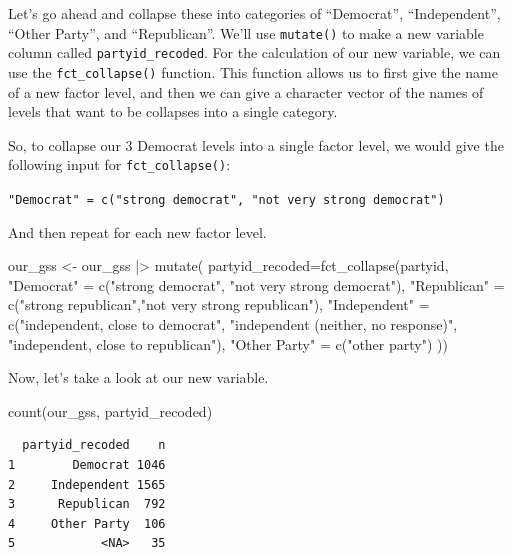 \documentclass[
  letterpaper,
  DIV=11,
  numbers=noendperiod]{scrreprt}
\newenvironment{Shaded}{\begin{snugshade}}{\end{snugshade}}
\newcommand{\AttributeTok}[1]{\textcolor[rgb]{0.40,0.45,0.13}{#1}}
\newcommand{\FunctionTok}[1]{\textcolor[rgb]{0.28,0.35,0.67}{#1}}
\newcommand{\NormalTok}[1]{\textcolor[rgb]{0.00,0.23,0.31}{#1}}
\newcommand{\OtherTok}[1]{\textcolor[rgb]{0.00,0.23,0.31}{#1}}
\newcommand{\SpecialCharTok}[1]{\textcolor[rgb]{0.37,0.37,0.37}{#1}}
\newcommand{\StringTok}[1]{\textcolor[rgb]{0.13,0.47,0.30}{#1}}
\begin{document}
Let's go ahead and collapse these into categories of ``Democrat'',
``Independent'', ``Other Party'', and ``Republican''. We'll use
\texttt{mutate()} to make a new variable column called
\texttt{partyid\_recoded}. For the calculation of our new variable, we
can use the \texttt{fct\_collapse()} function. This function allows us
to first give the name of a new factor level, and then we can give a
character vector of the names of levels that want to be collapses into a
single category.

So, to collapse our 3 Democrat levels into a single factor level, we
would give the following input for \texttt{fct\_collapse()}:

\texttt{"Democrat"\ =\ c("strong\ democrat",\ "not\ very\ strong\ democrat")}

And then repeat for each new factor level.

\begin{Shaded}
\begin{Highlighting}[]
\NormalTok{our\_gss }\OtherTok{\textless{}{-}}\NormalTok{ our\_gss }\SpecialCharTok{|\textgreater{}}
  \FunctionTok{mutate}\NormalTok{(}
    \AttributeTok{partyid\_recoded=}\FunctionTok{fct\_collapse}\NormalTok{(partyid, }
\StringTok{"Democrat"} \OtherTok{=} \FunctionTok{c}\NormalTok{(}\StringTok{"strong democrat"}\NormalTok{, }\StringTok{"not very strong democrat"}\NormalTok{),}
\StringTok{"Republican"} \OtherTok{=} \FunctionTok{c}\NormalTok{(}\StringTok{"strong republican"}\NormalTok{,}\StringTok{"not very strong republican"}\NormalTok{),}
\StringTok{"Independent"} \OtherTok{=} \FunctionTok{c}\NormalTok{(}\StringTok{"independent, close to democrat"}\NormalTok{, }\StringTok{"independent (neither, no response)"}\NormalTok{, }\StringTok{"independent, close to republican"}\NormalTok{),}
\StringTok{"Other Party"} \OtherTok{=} \FunctionTok{c}\NormalTok{(}\StringTok{"other party"}\NormalTok{)}
\NormalTok{))}
\end{Highlighting}
\end{Shaded}

Now, let's take a look at our new variable.

\begin{Shaded}
\begin{Highlighting}[]
\FunctionTok{count}\NormalTok{(our\_gss, partyid\_recoded)}
\end{Highlighting}
\end{Shaded}

\begin{verbatim}
  partyid_recoded    n
1        Democrat 1046
2     Independent 1565
3      Republican  792
4     Other Party  106
5            <NA>   35
\end{verbatim}
\end{document}
